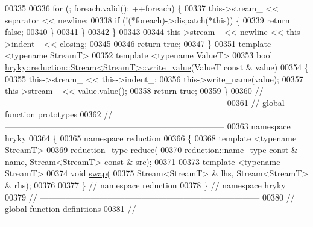 \begin{DoxyCode}
00335 
00336         \textcolor{keywordflow}{for} (; \textcolor{keywordflow}{foreach}.valid(); ++\textcolor{keywordflow}{foreach}) \{
00337             this->stream\_ << separator << newline;
00338             \textcolor{keywordflow}{if} (!(*foreach)->dispatch(*\textcolor{keyword}{this})) \{
00339                 \textcolor{keywordflow}{return} \textcolor{keyword}{false};
00340             \}
00341         \}
00342     \}
00343 
00344     this->stream\_ << newline << this->indent\_ << closing;
00345     
00346     \textcolor{keywordflow}{return} \textcolor{keyword}{true};
00347 \}
00351 \textcolor{keyword}{template} <\textcolor{keyword}{typename} StreamT>
00352 \textcolor{keyword}{template} <\textcolor{keyword}{typename} ValueT>
00353 \textcolor{keywordtype}{bool} \hyperlink{classhryky_1_1reduction_1_1_stream}{hryky::reduction::Stream<StreamT>::write_value}(ValueT \textcolor{keyword}{const} & value)
00354 \{
00355     this->stream\_ << this->indent\_;
00356     this->write\_name(value);
00357     this->stream\_ << value.value();
00358     \textcolor{keywordflow}{return} \textcolor{keyword}{true};
00359 \}
00360 \textcolor{comment}{//
      ------------------------------------------------------------------------------}
00361 \textcolor{comment}{// global function prototypes}
00362 \textcolor{comment}{//
      ------------------------------------------------------------------------------}
00363 \textcolor{keyword}{namespace }hryky
00364 \{
00365 \textcolor{keyword}{namespace }reduction
00366 \{
00368     \textcolor{keyword}{template} <\textcolor{keyword}{typename} StreamT>
00369     \hyperlink{namespacehryky_a343a9a4c36a586be5c2693156200eadc}{reduction_type} \hyperlink{namespacehryky_1_1reduction_a064022926c530d18aeb1b2abdf71800b}{reduce}(
00370         \hyperlink{namespacehryky_1_1reduction_ac686c30a4c8d196bbd0f05629a6b921f}{reduction::name_type} \textcolor{keyword}{const} & name, Stream<StreamT> \textcolor{keyword}{const} & src);
00371 
00373     \textcolor{keyword}{template} <\textcolor{keyword}{typename} StreamT>
00374     \textcolor{keywordtype}{void} \hyperlink{namespacehryky_1_1reduction_a493c83efdf5f9e9c49ba77e1b65325a1}{swap}(
00375         Stream<StreamT> & lhs, Stream<StreamT> & rhs);
00376 
00377 \} \textcolor{comment}{// namespace reduction}
00378 \} \textcolor{comment}{// namespace hryky}
00379 \textcolor{comment}{//
      ------------------------------------------------------------------------------}
00380 \textcolor{comment}{// global function definitions}
00381 \textcolor{comment}{//
      ------------------------------------------------------------------------------}

\end{DoxyCode}
